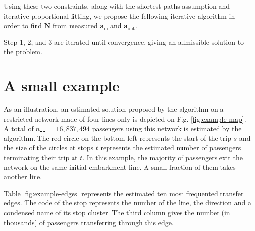 \documentclass{bmcart}
\begin{document}
Using these two constraints, along with the shortest paths assumption and iterative proportional fitting, we propose the following iterative algorithm in order to find $\mathbf{N}$ from measured $\mathbf{a}_\text{in}$ and $\mathbf{a}_\text{out}$. \\

\noindent {}

Step 1, 2, and 3 are iterated until convergence, giving an admissible solution to the problem.
%
\section{A small example}
%

As an illustration, an estimated solution proposed by the algorithm on a restricted network made of four lines only is depicted on Fig. \ref{fig:example-map}. A total of $n_{\bullet \bullet} = 16,837,494$ passengers using this network is estimated by the algorithm. The red circle on the bottom left represents the start of the trip $s$ and the size of the circles at stops $t$ represents the estimated number of passengers terminating their trip at $t$. In this example, the majority of passengers exit the network on the same initial embarkment line. A small fraction of them takes another line. 

Table \ref{fig:example-edges} represents the estimated ten most frequented transfer edges. The code of the stop represents the number of the line, the direction and a condensed name of its stop cluster. The third column gives the number (in thousands) of passengers transferring through this edge.
\end{document}

